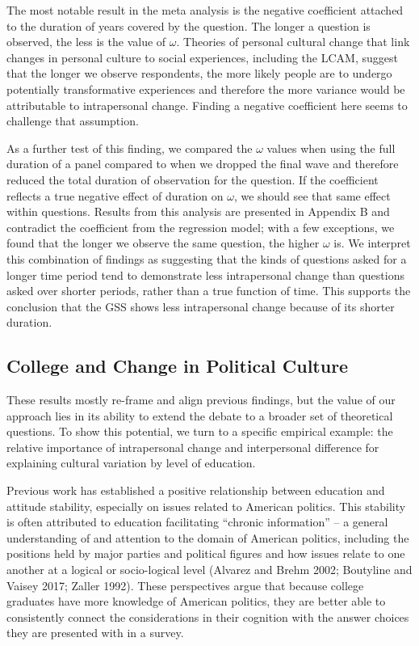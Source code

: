 \documentclass[
  12pt,
]{article}
\begin{document}
The most notable result in the meta analysis is the negative coefficient
attached to the duration of years covered by the question. The longer a
question is observed, the less is the value of \(\omega\). Theories of
personal cultural change that link changes in personal culture to social
experiences, including the LCAM, suggest that the longer we observe
respondents, the more likely people are to undergo potentially
transformative experiences and therefore the more variance would be
attributable to intrapersonal change. Finding a negative coefficient
here seems to challenge that assumption.

As a further test of this finding, we compared the \(\omega\) values
when using the full duration of a panel compared to when we dropped the
final wave and therefore reduced the total duration of observation for
the question. If the coefficient reflects a true negative effect of
duration on \(\omega\), we should see that same effect within questions.
Results from this analysis are presented in Appendix B and contradict
the coefficient from the regression model; with a few exceptions, we
found that the longer we observe the same question, the higher
\(\omega\) is. We interpret this combination of findings as suggesting
that the kinds of questions asked for a longer time period tend to
demonstrate less intrapersonal change than questions asked over shorter
periods, rather than a true function of time. This supports the
conclusion that the GSS shows less intrapersonal change because of its
shorter duration.

\hypertarget{college-and-change-in-political-culture}{%
\subsection{College and Change in Political
Culture}\label{college-and-change-in-political-culture}}

These results mostly re-frame and align previous findings, but the value
of our approach lies in its ability to extend the debate to a broader
set of theoretical questions. To show this potential, we turn to a
specific empirical example: the relative importance of intrapersonal
change and interpersonal difference for explaining cultural variation by
level of education.

Previous work has established a positive relationship between education
and attitude stability, especially on issues related to American
politics. This stability is often attributed to education facilitating
``chronic information'' -- a general understanding of and attention to
the domain of American politics, including the positions held by major
parties and political figures and how issues relate to one another at a
logical or socio-logical level (Alvarez and Brehm 2002; Boutyline and
Vaisey 2017; Zaller 1992). These perspectives argue that because college
graduates have more knowledge of American politics, they are better able
to consistently connect the considerations in their cognition with the
answer choices they are presented with in a survey.
\end{document}

